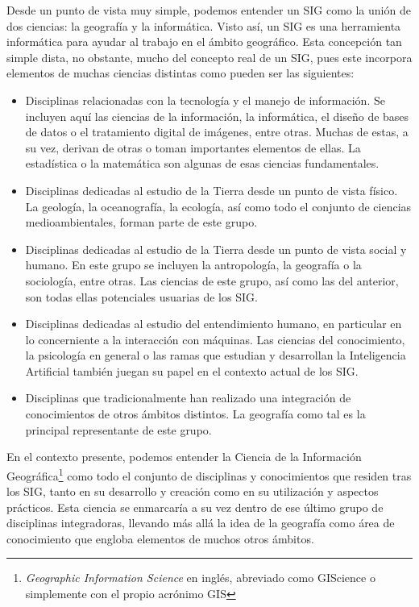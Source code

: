 Desde un punto de vista muy simple, podemos entender un SIG como la unión de dos ciencias: la geografía y la informática. Visto así, un SIG es una herramienta informática para ayudar al trabajo en el ámbito geográfico. Esta concepción tan simple dista, no obstante, mucho del concepto real de un SIG, pues este incorpora elementos de muchas ciencias distintas como pueden ser las siguientes\cite{webGoodchildNCGIA}:

\begin{itemize}
	\item Disciplinas relacionadas con la tecnología y el manejo de información. Se incluyen aquí las ciencias de la información, la informática, el diseño de bases de datos o el tratamiento digital de imágenes, entre otras. Muchas de estas, a su vez, derivan de otras o toman importantes elementos de ellas. La estadística o la matemática son algunas de esas ciencias fundamentales.
	\item Disciplinas dedicadas al estudio de la Tierra desde un punto de vista físico. La geología, la oceanografía, la ecología, así como todo el conjunto de ciencias medioambientales, forman parte de este grupo.
	\item Disciplinas dedicadas al estudio de la Tierra desde un punto de vista social y humano. En este grupo se incluyen la antropología, la geografía o la sociología, entre otras. Las ciencias de este grupo, así como las del anterior, son todas ellas potenciales usuarias de los SIG.
	\item Disciplinas dedicadas al estudio del entendimiento humano, en particular en lo concerniente a la interacción con máquinas. Las ciencias del conocimiento, la psicología en general o las ramas que estudian y desarrollan la Inteligencia Artificial también juegan su papel en el contexto actual de los SIG.
	\item Disciplinas que tradicionalmente han realizado una integración de conocimientos de otros ámbitos distintos. La geografía como tal es la principal representante de este grupo.
\end{itemize}

En el contexto presente, podemos entender la Ciencia de la Información Geográfica\footnote{\emph{Geographic Information Science} en inglés, abreviado como GIScience o simplemente con el propio acrónimo GIS} como todo el conjunto de disciplinas y conocimientos que residen tras los SIG, tanto en su desarrollo y creación como en su utilización y aspectos prácticos. Esta ciencia se enmarcaría a su vez dentro de ese último grupo de disciplinas integradoras, llevando más allá la idea de la geografía como área de conocimiento que engloba elementos de muchos otros ámbitos.

